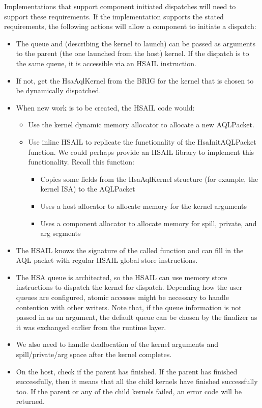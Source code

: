 \documentclass[draft]{book}
\begin{document}
Implementations that support component initiated dispatches will need to support
these requirements. If the implementation supports the stated requirements, the
following actions will allow a component to initiate a dispatch:
\begin{itemize}
\item The queue and  (describing the kernel to
  launch) can be passed as arguments to the parent (the one launched from the
  host) kernel. If the dispatch is to the same queue, it is accessible via an
  HSAIL instruction.
\item If not, get the Hsa\-Aql\-Kernel from the BRIG for the kernel that is
  chosen to be dynamically dispatched.
\item When new work is to be created, the HSAIL code would:
\begin{itemize}
\item Use the kernel dynamic memory allocator to allocate a new AQL\-Packet.
\item Use inline HSAIL to replicate the functionality of the
  Hsa\-Init\-AQL\-Packet function. We could perhaps provide an HSAIL library to
  implement this functionality. Recall this function:
\begin{itemize}
\item Copies some fields from the Hsa\-Aql\-Kernel structure (for example, the
  kernel ISA) to the AQL\-Packet
\item Uses a host allocator to allocate memory for the kernel arguments
\item Uses a component allocator to allocate memory for spill, private, and arg
  segments
\end{itemize}
\end{itemize}
\item The HSAIL knows the signature of the called function and can fill in the
  AQL packet with regular HSAIL global store instructions.
\item The HSA queue is architected, so the HSAIL can use memory store
  instructions to dispatch the kernel for dispatch. Depending how the user
  queues are configured, atomic accesses might be necessary to handle contention
  with other writers. Note that, if the queue information is not passed in as an
  argument, the default queue can be chosen by the finalizer as it was exchanged
  earlier from the runtime layer.
\item We also need to handle deallocation of the kernel arguments and
  spill/private/arg space after the kernel completes.
\item On the host, check if the parent has finished. If the parent has finished
  successfully, then it means that all the child kernels have finished
  successfully too. If the parent or any of the child kernels failed, an error
  code will be returned.
\end{itemize}
\end{document}
